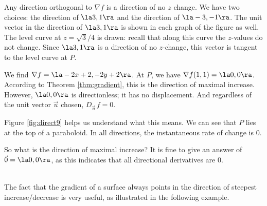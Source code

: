 {Any direction orthogonal to $\nabla f$ is a direction of no $z$ change. We have two choices: the direction of $\la 3,1\ra$ and the direction of $\la -3,-1\ra$. The unit vector in the direction of $\la 3,1\ra$ is shown in each graph of the figure as well. The level curve at $z=\sqrt{3}/4$ is drawn: recall that along this curve the $z$-values do not change. Since $\la 3,1\ra$ is a direction of no $z$-change, this vector is tangent to the level curve at $P$.
}\\

{We find $\nabla f = \la -2x+2, -2y+2\ra$. At $P$, we have $\nabla f(1,1) = \la 0,0\ra$. 
According to Theorem \ref{thm:gradient}, this is the direction of maximal increase. However, $\la 0,0\ra$ is directionless; it has no displacement. And regardless of the unit vector $\vec u$ chosen, $D_{\vec u\,}f = 0$.

Figure \ref{fig:direct9} helps us understand what this means. We can see that $P$ lies at the top of a paraboloid. In all directions, the instantaneous rate of change is 0. 

So what is the direction of maximal increase? It is fine to give an answer of $\vec 0 = \la 0,0\ra$, as this indicates that all directional derivatives are 0.
}\\

The fact that the gradient of a surface always points in the direction of steepest increase/decrease is very useful, as illustrated in the following example.\\

